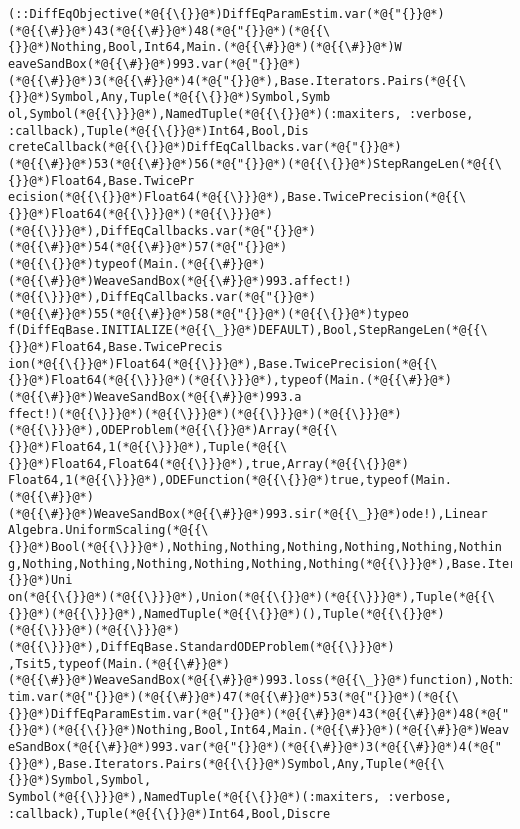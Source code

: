 \documentclass[12pt,a4paper]{article}
\begin{document}
\begin{lstlisting}
(::DiffEqObjective(*@{{\{}}@*)DiffEqParamEstim.var(*@{"{}}@*)(*@{{\#}}@*)43(*@{{\#}}@*)48(*@{"{}}@*)(*@{{\{}}@*)Nothing,Bool,Int64,Main.(*@{{\#}}@*)(*@{{\#}}@*)W
eaveSandBox(*@{{\#}}@*)993.var(*@{"{}}@*)(*@{{\#}}@*)3(*@{{\#}}@*)4(*@{"{}}@*),Base.Iterators.Pairs(*@{{\{}}@*)Symbol,Any,Tuple(*@{{\{}}@*)Symbol,Symb
ol,Symbol(*@{{\}}}@*),NamedTuple(*@{{\{}}@*)(:maxiters, :verbose, :callback),Tuple(*@{{\{}}@*)Int64,Bool,Dis
creteCallback(*@{{\{}}@*)DiffEqCallbacks.var(*@{"{}}@*)(*@{{\#}}@*)53(*@{{\#}}@*)56(*@{"{}}@*)(*@{{\{}}@*)StepRangeLen(*@{{\{}}@*)Float64,Base.TwicePr
ecision(*@{{\{}}@*)Float64(*@{{\}}}@*),Base.TwicePrecision(*@{{\{}}@*)Float64(*@{{\}}}@*)(*@{{\}}}@*)(*@{{\}}}@*),DiffEqCallbacks.var(*@{"{}}@*)(*@{{\#}}@*)54(*@{{\#}}@*)57(*@{"{}}@*)
(*@{{\{}}@*)typeof(Main.(*@{{\#}}@*)(*@{{\#}}@*)WeaveSandBox(*@{{\#}}@*)993.affect!)(*@{{\}}}@*),DiffEqCallbacks.var(*@{"{}}@*)(*@{{\#}}@*)55(*@{{\#}}@*)58(*@{"{}}@*)(*@{{\{}}@*)typeo
f(DiffEqBase.INITIALIZE(*@{{\_}}@*)DEFAULT),Bool,StepRangeLen(*@{{\{}}@*)Float64,Base.TwicePrecis
ion(*@{{\{}}@*)Float64(*@{{\}}}@*),Base.TwicePrecision(*@{{\{}}@*)Float64(*@{{\}}}@*)(*@{{\}}}@*),typeof(Main.(*@{{\#}}@*)(*@{{\#}}@*)WeaveSandBox(*@{{\#}}@*)993.a
ffect!)(*@{{\}}}@*)(*@{{\}}}@*)(*@{{\}}}@*)(*@{{\}}}@*)(*@{{\}}}@*),ODEProblem(*@{{\{}}@*)Array(*@{{\{}}@*)Float64,1(*@{{\}}}@*),Tuple(*@{{\{}}@*)Float64,Float64(*@{{\}}}@*),true,Array(*@{{\{}}@*)
Float64,1(*@{{\}}}@*),ODEFunction(*@{{\{}}@*)true,typeof(Main.(*@{{\#}}@*)(*@{{\#}}@*)WeaveSandBox(*@{{\#}}@*)993.sir(*@{{\_}}@*)ode!),Linear
Algebra.UniformScaling(*@{{\{}}@*)Bool(*@{{\}}}@*),Nothing,Nothing,Nothing,Nothing,Nothing,Nothin
g,Nothing,Nothing,Nothing,Nothing,Nothing,Nothing(*@{{\}}}@*),Base.Iterators.Pairs(*@{{\{}}@*)Uni
on(*@{{\{}}@*)(*@{{\}}}@*),Union(*@{{\{}}@*)(*@{{\}}}@*),Tuple(*@{{\{}}@*)(*@{{\}}}@*),NamedTuple(*@{{\{}}@*)(),Tuple(*@{{\{}}@*)(*@{{\}}}@*)(*@{{\}}}@*)(*@{{\}}}@*),DiffEqBase.StandardODEProblem(*@{{\}}}@*)
,Tsit5,typeof(Main.(*@{{\#}}@*)(*@{{\#}}@*)WeaveSandBox(*@{{\#}}@*)993.loss(*@{{\_}}@*)function),Nothing(*@{{\}}}@*),DiffEqParamEs
tim.var(*@{"{}}@*)(*@{{\#}}@*)47(*@{{\#}}@*)53(*@{"{}}@*)(*@{{\{}}@*)DiffEqParamEstim.var(*@{"{}}@*)(*@{{\#}}@*)43(*@{{\#}}@*)48(*@{"{}}@*)(*@{{\{}}@*)Nothing,Bool,Int64,Main.(*@{{\#}}@*)(*@{{\#}}@*)Weav
eSandBox(*@{{\#}}@*)993.var(*@{"{}}@*)(*@{{\#}}@*)3(*@{{\#}}@*)4(*@{"{}}@*),Base.Iterators.Pairs(*@{{\{}}@*)Symbol,Any,Tuple(*@{{\{}}@*)Symbol,Symbol,
Symbol(*@{{\}}}@*),NamedTuple(*@{{\{}}@*)(:maxiters, :verbose, :callback),Tuple(*@{{\{}}@*)Int64,Bool,Discre

\end{lstlisting}
\end{document}
